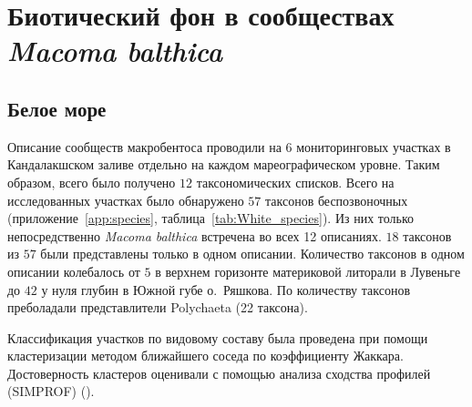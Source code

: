 		\section{Биотический фон в сообществах {\it Macoma balthica}}

	\subsection{Белое море}
Описание сообществ макробентоса проводили на 6 мониторинговых участках в Кандалакшском заливе отдельно на каждом мареографическом уровне. 
Таким образом, всего было получено $12$ таксономических списков.
Всего на  исследованных участках было обнаружено $57$ таксонов беспозвоночных (приложение~\ref{app:species}, таблица~\ref{tab:White_species}).
Из них только непосредственно {\it Macoma balthica} встречена во всех 12 описаниях.
$18$ таксонов из $57$ были представлены только в одном описании.
Количество таксонов в одном описании колебалось от $5$ в верхнем горизонте материковой литорали в Лувеньге до $42$ у нуля глубин в Южной губе о.~Ряшкова.
По количеству таксонов преболадали представлители Polychaeta (22 таксона).

Классификация участков по видовому составу была проведена при помощи кластеризации методом ближайшего соседа по коэффициенту Жаккара. 
Достоверность кластеров оценивали с помощью анализа сходства профилей (SIMPROF) (\cite{Clarke_et_al_2008}).

